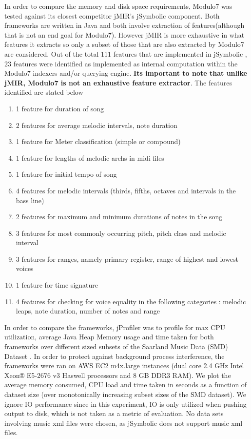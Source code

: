 \noindent In order to compare the memory and disk space requirements, Modulo7 was tested against its closest competitor jMIR's \cite{jMIR} jSymbolic component. Both frameworks are written in Java and both involve extraction of features(although that is not an end goal for Modulo7). However jMIR is more exhaustive in what features it extracts so only a subset of those that are also extracted by Modulo7 are considered. Out of the total 111 features that are implemented in jSymbolic \cite{jSymbolic}, 23 features were identified as implemented as internal computation within the Modulo7 indexers and/or querying engine. \textbf{Its important to note that unlike jMIR, Modulo7 is not an exhaustive feature extractor}. The features identified are stated below \\
\begin{enumerate}
\item 1 feature for duration of song
\item 2 features for average melodic intervals, note duration
\item 1 feature for Meter classification (simple or compound)
\item 1 feature for lengths of melodic archs in midi files
\item 1 feature for initial tempo of song
\item 4 features for melodic intervals (thirds, fifths, octaves and intervals in the bass line)
\item 2 features for maximum and minimum durations of notes in the song
\item 3 features for most commonly occurring pitch, pitch class and melodic interval
\item 3 features for ranges, namely primary register, range of highest and lowest voices
\item 1 feature for time signature
\item 4 features for checking for voice equality in the following categories : melodic leaps, note duration, number of notes and range \\
\end{enumerate}
\noindent In order to compare the frameworks, jProfiler was to profile for max CPU utilization, average Java Heap Memory usage and time taken for both frameworks over different sized subsets of the Saarland Music Data (SMD) Dataset \cite{saarlandmsd}. In order to protect against background process interference, the frameworks were ran on AWS EC2 m4x.large instances (dual core 2.4 GHz Intel Xeon® E5-2676 v3 Haswell processors and 8 GB DDR3 RAM). We plot the average memory consumed, CPU load and time taken in seconds as a function of dataset size (over monotonically increasing subset sizes of the SMD dataset). We ignore IO performance since in this experiment, IO is only utilized when pushing output to disk, which is not taken as a metric of evaluation. No data sets involving music xml files were chosen, as jSymbolic does not support music xml files. 

